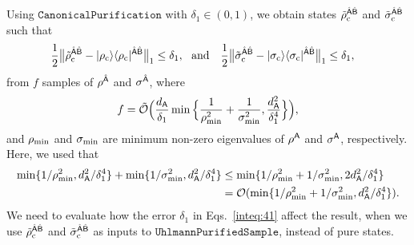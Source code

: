Using $\mathtt{CanonicalPurification}$ with $\delta_1 \in (0, 1)$, we obtain states $\tilde{\rho}_{\rm c}^{\hat{{\mathsf{A}}}\hat{{\mathsf{B}}}}$ and $\tilde{\sigma}_{\rm c}^{\hat{{\mathsf{A}}}\hat{{\mathsf{B}}}}$ such that
\begin{align}
\label{inteq:41}
    &\frac{1}{2}\big\|\tilde{\rho}_{\rm c}^{\hat{{\mathsf{A}}}\hat{{\mathsf{B}}}} - |\rho_{\rm c}\rangle\langle\rho_{\rm c}|^{\hat{{\mathsf{A}}}\hat{{\mathsf{B}}}}\big\|_1 \leq \delta_1, \ \ \text{and} \ \ \ \frac{1}{2}\big\|\tilde{\sigma}_{\rm c}^{\hat{{\mathsf{A}}}\hat{{\mathsf{B}}}} - |\sigma_{\rm c}\rangle\langle\sigma_{\rm c}|^{\hat{{\mathsf{A}}}\hat{{\mathsf{B}}}}\big\|_1 \leq \delta_1,
\end{align}
from $f$ samples of $\rho^{\hat{{\mathsf{A}}}}$ and $\sigma^{\hat{{\mathsf{A}}}}$, where 
\begin{align}
\label{inteq:43}
    f = \tilde{{\mathcal{O}}}\Big(\frac{d_{\mathsf{A}}}{\delta_1}\min\Big\{\frac{1}{\rho_{\rm min}^2} + \frac{1}{\sigma_{\rm min}^2}, \frac{d_{\mathsf{A}}^2}{\delta_1^4}\Big\}\Big),
\end{align}
and $\rho_{\rm min}$ and $\sigma_{\rm min}$ are minimum non-zero eigenvalues of $\rho^{\mathsf{A}}$ and $\sigma^{\mathsf{A}}$, respectively. Here, we used that 
\begin{align}
    \min\{1/\rho_{\rm min}^2, d_{\mathsf{A}}^2/\delta_1^4\} + \min\{1/\sigma_{\rm min}^2, d_{\mathsf{A}}^2/\delta_1^4\}  
    &\leq \min\{1/\rho_{\rm min}^2 + 1/\sigma_{\rm min}^2, 2d_{\mathsf{A}}^2/\delta_1^4\} \\
    &= {\mathcal{O}}(\min\{1/\rho_{\rm min}^2 + 1/\sigma_{\rm min}^2, d_{\mathsf{A}}^2/\delta_1^4\}).
\end{align}
We need to evaluate how the error $\delta_1$ in Eqs.~\eqref{inteq:41} affect the result, when we use $\tilde{\rho}_{\rm c}^{\hat{{\mathsf{A}}}\hat{{\mathsf{B}}}}$ and $\tilde{\sigma}_{\rm c}^{\hat{{\mathsf{A}}}\hat{{\mathsf{B}}}}$ as inputs to $\mathtt{UhlmannPurifiedSample}$, instead of pure states. 


